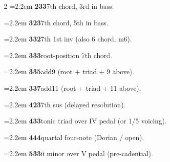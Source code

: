\documentclass[12pt]{article}
\begin{document}
\begin{multicols}{2}
\noindent\hangindent=2.2em {\juliamono\bfseries 233}\enspace\textemdash\enspace 7th chord, 3rd in bass.\par
\noindent\hangindent=2.2em {\juliamono\bfseries 323}\enspace\textemdash\enspace 7th chord, 5th in bass.\par
\noindent\hangindent=2.2em {\juliamono\bfseries 332}\enspace\textemdash\enspace 7th 1st inv (also 6 chord, m6).\par
\noindent\hangindent=2.2em {\juliamono\bfseries 333}\enspace\textemdash\enspace root-position 7th chord.\par
\noindent\hangindent=2.2em {\juliamono\bfseries 335}\enspace\textemdash\enspace add9 (root + triad + 9 above).\par
\noindent\hangindent=2.2em {\juliamono\bfseries 337}\enspace\textemdash\enspace add11 (root + triad + 11 above).\par
\noindent\hangindent=2.2em {\juliamono\bfseries 423}\enspace\textemdash\enspace 7th sus (delayed resolution).\par
\noindent\hangindent=2.2em {\juliamono\bfseries 433}\enspace\textemdash\enspace tonic triad over IV pedal (or 1/5 voicing).\par
\noindent\hangindent=2.2em {\juliamono\bfseries 444}\enspace\textemdash\enspace quartal four-note (Dorian / open).\par
\noindent\hangindent=2.2em {\juliamono\bfseries 533}\enspace\textemdash\enspace ii minor over V pedal (pre-cadential).\par

\end{multicols}
\end{document}
